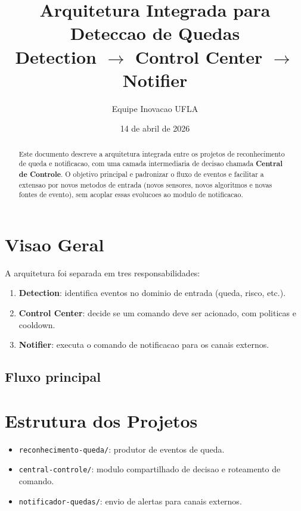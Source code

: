 \documentclass[12pt,a4paper]{article}
\title{Arquitetura Integrada para Deteccao de Quedas\\\large Detection $\rightarrow$ Control Center $\rightarrow$ Notifier}
\author{Equipe Inovacao UFLA}
\date{14 de abril de 2026}
\begin{document}
\maketitle

\begin{abstract}
Este documento descreve a arquitetura integrada entre os projetos de reconhecimento de queda e notificacao, com uma camada intermediaria de decisao chamada \textbf{Central de Controle}. O objetivo principal e padronizar o fluxo de eventos e facilitar a extensao por novos metodos de entrada (novos sensores, novos algoritmos e novas fontes de evento), sem acoplar essas evolucoes ao modulo de notificacao.
\end{abstract}

\section{Visao Geral}
A arquitetura foi separada em tres responsabilidades:
\begin{enumerate}
    \item \textbf{Detection}: identifica eventos no dominio de entrada (queda, risco, etc.).
    \item \textbf{Control Center}: decide se um comando deve ser acionado, com politicas e cooldown.
    \item \textbf{Notifier}: executa o comando de notificacao para os canais externos.
\end{enumerate}

\subsection*{Fluxo principal}
\begin{center}
\end{center}

\section{Estrutura dos Projetos}
\begin{itemize}
    \item \texttt{reconhecimento-queda/}: produtor de eventos de queda.
    \item \texttt{central-controle/}: modulo compartilhado de decisao e roteamento de comando.
    \item \texttt{notificador-quedas/}: envio de alertas para canais externos.
\end{itemize}
\end{document}
